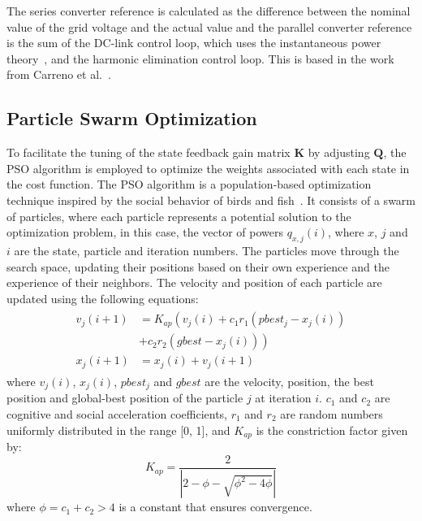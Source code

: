 The series converter reference is calculated as the difference between the nominal value of the grid voltage and the actual value and the parallel converter reference is the sum of the DC-link control loop, which uses the instantaneous power theory~\cite{akagiControlStrategyActive1986}, and the harmonic elimination control loop. This is based in the work from Carreno et al.~\cite{carrenoStateFeedbackControlHybrid2024}.

\subsection{Particle Swarm Optimization}

To facilitate the tuning of the state feedback gain matrix $\mathbf{K}$ by adjusting $\mathbf{Q}$, the PSO algorithm is employed to optimize the weights associated with each state in the cost function. The PSO algorithm is a population-based optimization technique inspired by the social behavior of birds and fish~\cite{clercSwarmQueenDeterministic1999}. It consists of a swarm of particles, where each particle represents a potential solution to the optimization problem, in this case, the vector of powers $q_{x,j}(i)$, where $x$, $j$ and $i$ are the state, particle and iteration numbers. The particles move through the search space, updating their positions based on their own experience and the experience of their neighbors. The velocity and position of each particle are updated using the following equations:
\begin{align}
    \begin{aligned}
        v_j(i + 1) &= K_{ap}\left(v_j(i) + c_1 r_1 (pbest_j - x_j(i)) \right.\\
        & \left. + c_2 r_2 (gbest - x_j(i))\right)\\
        x_j(i + 1) &= x_j(i) + v_j(i + 1)
    \end{aligned}
\end{align}
where $v_j(i)$, $x_j(i)$, $pbest_j$ and $gbest$ are the velocity, position, the best position and global-best position of the particle $j$ at iteration $i$. $c_1$ and $c_2$ are cognitive and social acceleration coefficients, $r_1$ and $r_2$ are random numbers uniformly distributed in the range [0, 1], and $K_{ap}$ is the constriction factor given by:
\begin{equation}
    K_{ap} = \dfrac{2}{\left|2 - \phi - \sqrt{\phi^2 - 4\phi}\right|}
\end{equation}
where $\phi = c_1 + c_2 > 4$ is a constant that ensures convergence.

